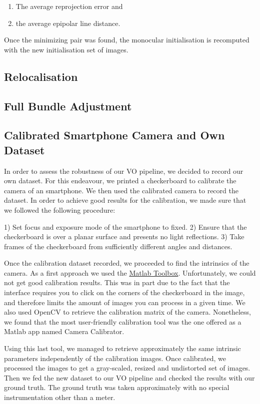 \begin{enumerate}
\item The average reprojection error and 
\item the average epipolar line distance.
\end{enumerate}

Once the minimizing pair was found, the monocular initialisation is recomputed with the new initialisation set of images.

\subsection{Relocalisation}

\subsection{Full Bundle Adjustment}

\subsection{Calibrated Smartphone Camera and Own Dataset}

In order to assess the robustness of our VO pipeline, we decided to record our own dataset.
For this endeavour, we printed a checkerboard to calibrate the camera of an smartphone.
We then used the calibrated camera to record the dataset.
In order to achieve good results for the calibration, we made sure that we followed the following procedure:

1) Set focus and exposure mode of the smartphone to fixed.
2) Ensure that the checkerboard is over a planar surface and presents no light reflections.
3) Take frames of the checkerboard from sufficiently different angles and distances.

Once the calibration dataset recorded, we proceeded to find the intrinsics of the camera.
As a first approach we used the \href{https://www.vision.caltech.edu/bouguetj/calib_doc/}{Matlab Toolbox}.
Unfortunately, we could not get good calibration results.
This was in part due to the fact that the interface requires you to click on the
corners of the checkerboard in the image, and therefore limits the amount of images you can process in a given time.
We also used OpenCV to retrieve the calibration matrix of the camera. Nonetheless, we found that the most user-friendly
calibration tool was the one offered as a Matlab app named Camera Calibrator.

Using this last tool, we managed to retrieve approximately the same intrinsic parameters independently of the calibration images.
Once calibrated, we processed the images to get a gray-scaled, resized and undistorted set of images. Then we fed the new
dataset to our VO pipeline and checked the results with our ground truth.
The ground truth was taken approximately with no special instrumentation other than a meter.

